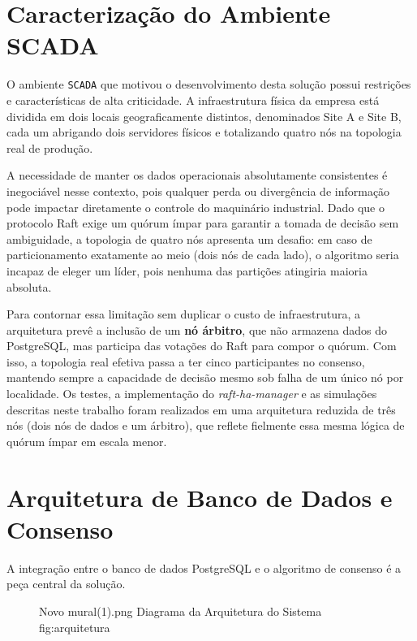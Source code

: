     \section{Caracterização do Ambiente SCADA}
    
        O ambiente \verb|SCADA| que motivou o desenvolvimento desta solução possui restrições e características de alta criticidade. A infraestrutura física da empresa está dividida em dois locais geograficamente distintos, denominados Site A e Site B, cada um abrigando dois servidores físicos e totalizando quatro nós na topologia real de produção.

        A necessidade de manter os dados operacionais absolutamente consistentes é inegociável nesse contexto, pois qualquer perda ou divergência de informação pode impactar diretamente o controle do maquinário industrial. Dado que o protocolo Raft exige um quórum ímpar para garantir a tomada de decisão sem ambiguidade, a topologia de quatro nós apresenta um desafio: em caso de particionamento exatamente ao meio (dois nós de cada lado), o algoritmo seria incapaz de eleger um líder, pois nenhuma das partições atingiria maioria absoluta.

        Para contornar essa limitação sem duplicar o custo de infraestrutura, a arquitetura prevê a inclusão de um \textbf{nó árbitro}, que não armazena dados do PostgreSQL, mas participa das votações do Raft para compor o quórum. Com isso, a topologia real efetiva passa a ter cinco participantes no consenso, mantendo sempre a capacidade de decisão mesmo sob falha de um único nó por localidade. Os testes, a implementação do \textit{raft-ha-manager} e as simulações descritas neste trabalho foram realizados em uma arquitetura reduzida de três nós (dois nós de dados e um árbitro), que reflete fielmente essa mesma lógica de quórum ímpar em escala menor.
    
    \section{Arquitetura de Banco de Dados e Consenso}
    
        A integração entre o banco de dados PostgreSQL e o algoritmo de consenso é a peça central da solução.

        \begin{figure}[!ht]
            {Novo mural(1).png}
            {Diagrama da Arquitetura do Sistema} 
            {fig:arquitetura}
        \end{figure}
    
